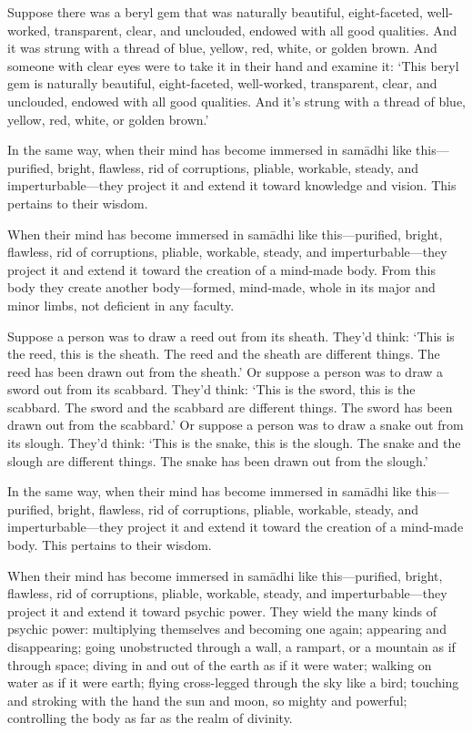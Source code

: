 \documentclass[12pt,openany]{book}%
\begin{document}
Suppose there was a beryl gem that was naturally beautiful, eight-faceted, well-worked, transparent, clear, and unclouded, endowed with all good qualities. And it was strung with a thread of blue, yellow, red, white, or golden brown. And someone with clear eyes were to take it in their hand and examine it: ‘This beryl gem is naturally beautiful, eight-faceted, well-worked, transparent, clear, and unclouded, endowed with all good qualities. And it’s strung with a thread of blue, yellow, red, white, or golden brown.’ 

In the same way, when their mind has become immersed in \textsanskrit{samādhi} like this—purified, bright, flawless, rid of corruptions, pliable, workable, steady, and imperturbable—they project it and extend it toward knowledge and vision. This pertains to their wisdom. 

When their mind has become immersed in \textsanskrit{samādhi} like this—purified, bright, flawless, rid of corruptions, pliable, workable, steady, and imperturbable—they project it and extend it toward the creation of a mind-made body. From this body they create another body—formed, mind-made, whole in its major and minor limbs, not deficient in any faculty. 

Suppose a person was to draw a reed out from its sheath. They’d think: ‘This is the reed, this is the sheath. The reed and the sheath are different things. The reed has been drawn out from the sheath.’ Or suppose a person was to draw a sword out from its scabbard. They’d think: ‘This is the sword, this is the scabbard. The sword and the scabbard are different things. The sword has been drawn out from the scabbard.’ Or suppose a person was to draw a snake out from its slough. They’d think: ‘This is the snake, this is the slough. The snake and the slough are different things. The snake has been drawn out from the slough.’ 

In the same way, when their mind has become immersed in \textsanskrit{samādhi} like this—purified, bright, flawless, rid of corruptions, pliable, workable, steady, and imperturbable—they project it and extend it toward the creation of a mind-made body. This pertains to their wisdom. 

When their mind has become immersed in \textsanskrit{samādhi} like this—purified, bright, flawless, rid of corruptions, pliable, workable, steady, and imperturbable—they project it and extend it toward psychic power. They wield the many kinds of psychic power: multiplying themselves and becoming one again; appearing and disappearing; going unobstructed through a wall, a rampart, or a mountain as if through space; diving in and out of the earth as if it were water; walking on water as if it were earth; flying cross-legged through the sky like a bird; touching and stroking with the hand the sun and moon, so mighty and powerful; controlling the body as far as the realm of divinity. 
\end{document}
